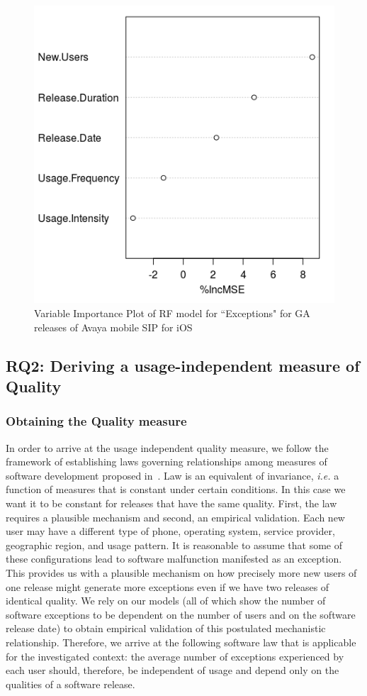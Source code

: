 \documentclass[smallcondensed]{svjour3}     %
\begin{document}
\begin{figure}[!t]
\centering
\includegraphics[width=0.4\linewidth]{rfI}%
\caption{Variable Importance Plot of RF model for ``Exceptions" for GA releases of Avaya mobile SIP for iOS}
\label{fig:rfI}
\vspace{-10pt}
\end{figure}

\subsection{RQ2: Deriving a usage-independent measure of Quality}\label{s:qual}

\subsubsection{Obtaining the Quality measure}
In order to arrive at the usage independent quality measure, we follow the framework of establishing laws governing relationships among measures of software development proposed in~\cite{mockuskeynote}. Law is an equivalent of invariance, \emph{i.e.} a function of measures that is constant under certain conditions. In this case we want it to be constant for releases that have the same quality. First, the law requires a plausible mechanism and second, an empirical validation. Each new user may have a different type of phone, operating system, service provider, geographic region, and usage pattern. It is reasonable to assume that some of these configurations lead to software malfunction manifested as an exception. This provides us with a plausible mechanism on how precisely more new users of one release might generate more exceptions even if we have two releases of identical quality. 
We rely on our models (all of which show the number of software 
exceptions to be dependent on the number of users and on the software release date) to obtain empirical validation of this postulated mechanistic relationship. Therefore,
we arrive at the following software law that is applicable for the investigated context: the average number of 
exceptions experienced by each user should, therefore, be independent of usage and depend only on the qualities of a software release.
\end{document}
